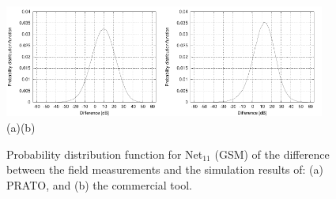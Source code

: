 \begin{figure}[h]
\centering

\includegraphics[width=0.47\textwidth]{08-real_network_planning/img/gsm_prato_diff}\includegraphics[width=0.47\textwidth]{08-real_network_planning/img/gsm_tcpu_diff}\\\hspace{0.4cm}(a)\hspace{6.7cm}(b)

\caption{Probability distribution function for Net$_{11}$ (GSM) of the difference
between the field measurements and the simulation results of: (a)
PRATO, and (b) the commercial tool. \label{fig:08-Prediction_difference-GSM}}
\end{figure}


